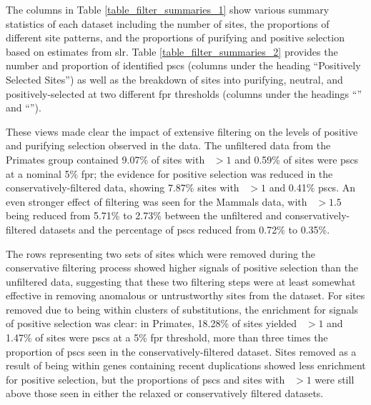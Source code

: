 The columns in Table \ref{table_filter_summaries_1} show various
summary statistics of each \sw dataset including the number of sites,
the proportions of different site patterns, and the proportions of
purifying and positive selection based on \omgml estimates from
\ac{slr}. Table \ref{table_filter_summaries_2} provides the number and
proportion of identified \acp{psc} (columns under the heading
``Positively Selected Sites'') as well as the breakdown of sites into
purifying, neutral, and positively-selected at two different \ac{fpr}
thresholds (columns under the headings ``'' and
``'').

These views made clear the impact of extensive filtering on the levels
of positive and purifying selection observed in the data. The
unfiltered data from the Primates group contained 9.07\% of sites with
\omgml~$>1$ and 0.59\% of sites were \acp{psc} at a nominal 5\%
\ac{fpr}; the evidence for positive selection was reduced in the
conservatively-filtered data, showing 7.87\% sites with \omgml~$>1$
and 0.41\% \acp{psc}. An even stronger effect of filtering was seen
for the Mammals data, with \omgml~$>1.5$ being reduced from 5.71\% to
2.73\% between the unfiltered and conservatively-filtered datasets and
the percentage of \acp{psc} reduced from 0.72\% to 0.35\%.

The rows representing two sets of sites which were removed during the
conservative filtering process showed higher signals of positive
selection than the unfiltered data, suggesting that these two
filtering steps were at least somewhat effective in removing anomalous
or untrustworthy sites from the dataset. For sites removed due to
being within clusters of \nsyn substitutions, the enrichment for
signals of positive selection was clear: in Primates, 18.28\% of sites
yielded \omgml~$>1$ and 1.47\% of sites were \acp{psc} at a 5\%
\ac{fpr} threshold, more than three times the proportion of \acp{psc}
seen in the conservatively-filtered dataset. Sites removed as a result
of being within genes containing recent duplications showed less
enrichment for positive selection, but the proportions of \acp{psc}
and sites with \omgml~$>1$ were still above those seen in either the
relaxed or conservatively filtered datasets.

